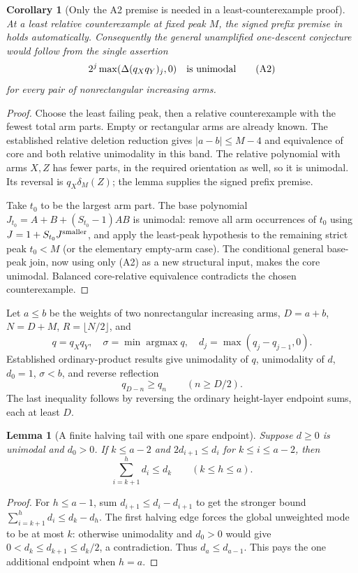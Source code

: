 \documentclass[11pt]{article}
\newtheorem{lemma}[proposition]{Lemma}
\newtheorem{corollary}[proposition]{Corollary}
\begin{document}
\begin{corollary}[Only the A2 premise is needed in a least-counterexample proof]
At a least relative counterexample at fixed peak $M$, the signed
prefix premise in {\normalfont{}} holds
automatically. Consequently the general unamplified one-descent
conjecture would follow from the single assertion
\[
       2^j\max(\Delta(q_Xq_Y)_j,0)\quad\hbox{is unimodal}
       \tag{A2}
\]
for every pair of nonrectangular increasing arms.
\end{corollary}
\begin{proof}
Choose the least failing peak, then a relative counterexample with
the fewest total arm parts. Empty or rectangular arms are already
known. The established relative deletion reduction gives
$|a-b|\le M-4$ and equivalence of core and both relative
unimodality in this band. The relative polynomial with arms
$X,Z$ has fewer parts, in the required orientation as well,
so it is unimodal. Its reversal is $q_X\delta_M(Z)$; the lemma
supplies the signed prefix premise.

Take $t_0$ to be the largest arm part. The base polynomial
$J_{t_0}=A+B+(S_{t_0}-1)AB$ is unimodal: remove all arm
occurrences of $t_0$ using $J=1+S_{t_0}J^{\rm smaller}$,
and apply the least-peak hypothesis to the remaining strict
peak $t_0<M$ (or the elementary empty-arm case).
The conditional general base-peak join, now using only (A2)
as a new structural input, makes the core unimodal. Balanced
core-relative equivalence contradicts the chosen counterexample.
\end{proof}

\par\medskip

Let $a\le b$ be the weights of two nonrectangular increasing arms,
$D=a+b$, $N=D+M$, $R=\lfloor N/2\rfloor$, and
\[
 q=q_Xq_Y,\quad \sigma=\min\operatorname{argmax}q,
 \quad d_j=\max(q_j-q_{j-1},0).
\]
Established ordinary-product results give unimodality of $q$,
unimodality of $d$, $d_0=1$, $\sigma<b$, and reverse reflection
\[
                         q_{D-n}\ge q_n\qquad(n\ge D/2).
\]
The last inequality follows by reversing the ordinary height-layer
endpoint sums, each at least $D$.

\begin{lemma}[A finite halving tail with one spare endpoint]
Suppose $d\ge0$ is unimodal and $d_0>0$.
If $k\le a-2$ and $2d_{i+1}\le d_i$ for $k\le i\le a-2$,
then
\[
                   \sum_{i=k+1}^{h}d_i\le d_k
                              \qquad(k\le h\le a).
\]
\end{lemma}
\begin{proof}
For $h\le a-1$, sum $d_{i+1}\le d_i-d_{i+1}$ to get
the stronger bound $\sum_{i=k+1}^h d_i\le d_k-d_h$.
The first halving edge forces the global unweighted mode to
be at most $k$: otherwise unimodality and $d_0>0$ would give
$0<d_k\le d_{k+1}\le d_k/2$, a contradiction.
Thus $d_a\le d_{a-1}$. This pays the one additional endpoint
when $h=a$.
\end{proof}
\end{document}
